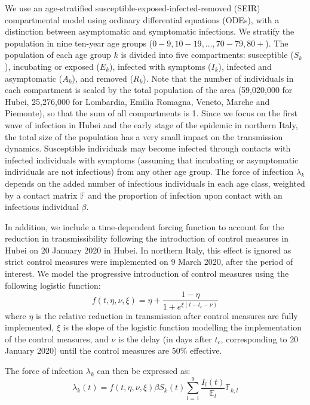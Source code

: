 \documentclass{article}
\begin{document}
	We use an age-stratified susceptible-exposed-infected-removed (SEIR) compartmental model using ordinary differential equations (ODEs), with a distinction between asymptomatic and symptomatic infections. 
	We stratify the population in nine ten-year age groups ($0-9, 10-19, \ldots, 70-79, 80+$). 
	The population of each age group $k$ is divided into five compartments: susceptible ($S_k$), incubating or exposed ($E_k$), infected with symptoms ($I_k$), infected and asymptomatic ($A_k$), and removed ($R_k$).
	Note that the number of individuals in each compartment is scaled by the total population of the area (59,020,000 for Hubei, 25,276,000 for Lombardia, Emilia Romagna, Veneto, Marche and Piemonte), so that the sum of all compartments is 1.
	Since we focus on the first wave of infection in Hubei and the early stage of the epidemic in northern Italy, the total size of the population has a very small impact on the transmission dynamics.
	Susceptible individuals may become infected through contacts with infected individuals with symptoms (assuming that incubating or asymptomatic individuals are not infectious) from any other age group.
	The force of infection $\lambda_k$ depends on the added number of infectious individuals in each age class, weighted by a contact matrix $\mathds{F}$ and the proportion of infection upon contact with an infectious individual $\beta$.
	
	In addition, we include a time-dependent forcing function to account for the reduction in transmissibility following the introduction of control measures in Hubei on 20 January 2020 in Hubei. In northern Italy, this effect is ignored as strict control measures were implemented on 9 March 2020, after the period of interest.
	We model the progressive introduction of control measures using the following logistic function:
	\begin{equation}
	f(t,\eta,\nu, \xi) = \eta + \frac{1-\eta}{1+e^{\xi(t-t_c-\nu)}}
	\end{equation}
	where $\eta$ is the relative reduction in transmission after control measures are fully implemented, $\xi$ is the slope of the logistic function modelling the implementation of the control measures, and $\nu$ is the delay (in days after $t_c$, corresponding to 20 January 2020) until the control measures are 50\% effective.
	
	The force of infection $\lambda_k$ can then be expressed as:
	\begin{equation}
	\lambda_k(t) = f(t,\eta,\nu, \xi) \beta S_k(t) \sum_{l=1}^9  \dfrac{I_l(t)}{\mathds{E}_l}  \mathds{F}_{k,l} 
	\end{equation}
	
\end{document}
